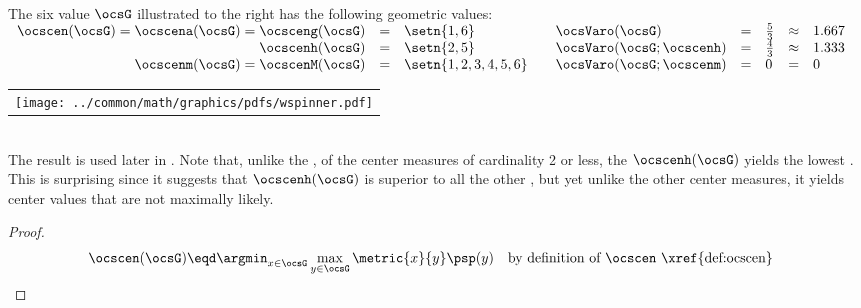 \begin{tabstr}{0.75}
\begin{example}
\label{ex:wspinner}\mbox{}\\
\begin{minipage}{\tw-35mm}%
The six value  $\ocsG$  
illustrated to the right has the following geometric values:
\\\indentx$\begin{array}{rcl@{\qquad}lclcl}
  \ocscen(\ocsG)=\ocscena(\ocsG)=\ocsceng(\ocsG) &=& \setn{1,6}         &\ocsVaro(\ocsG) &=& \frac{5}{3} &\approx& 1.667\\
  \ocscenh(\ocsG)                                &=& \setn{2,5}         &\ocsVaro(\ocsG;\ocscenh) &=& \frac{4}{3} &\approx& 1.333\\
  \ocscenm(\ocsG)=\ocscenM(\ocsG)                &=& \setn{1,2,3,4,5,6} &\ocsVaro(\ocsG;\ocscenm) &=& 0           &=&       0
\end{array}$
\end{minipage}\hfill%
\begin{tabular}{c}
  \gsize%
  \psset{unit=8mm}%
  \centering%
  {\texttt{[image: ../common/math/graphics/pdfs/wspinner.pdf]}}%
\end{tabular}\\
The  result is used later in .
Note that, unlike the  ,
of the center measures of cardinality 2 or less, the  $\ocscenh(\ocsG)$
yields the lowest  .
This is surprising since it suggests that $\ocscenh(\ocsG)$ is superior to 
all the other  ,
but yet unlike the other center measures, it yields center values that are not maximally likely.
\end{example}
\begin{proof}
  \begin{align*}
    \ocscen(\ocsG)
      &\eqd \argmin_{x\in\ocsG}\max_{y\in\ocsG}\metric{x}{y}\psp(y)
      &&\text{by definition of $\ocscen$ \xref{def:ocscen}}

\end{align*}
\end{proof}
\end{tabstr}
